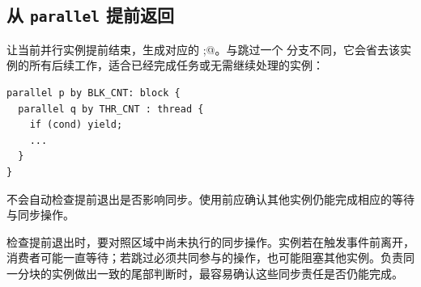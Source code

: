 \subsection*{从 \texttt{parallel} 提前返回}

\co@yield@ 让当前并行实例提前结束，生成对应的 \co@return;@。与跳过一个 \co@if@ 分支不同，它会省去该实例的所有后续工作，适合已经完成任务或无需继续处理的实例：

\begin{lstlisting}[language=croqtile,caption={从 parallel 提前返回}]
parallel p by BLK_CNT: block {
  parallel q by THR_CNT : thread {
    if (cond) yield;
    ...
  }
}
\end{lstlisting}

\begin{keypoint}
\co@yield@ 不会自动检查提前退出是否影响同步。使用前应确认其他实例仍能完成相应的等待与同步操作。
\end{keypoint}

检查提前退出时，要对照区域中尚未执行的同步操作。实例若在触发事件前离开，消费者可能一直等待；若跳过必须共同参与的操作，也可能阻塞其他实例。负责同一分块的实例做出一致的尾部判断时，最容易确认这些同步责任是否仍能完成。
